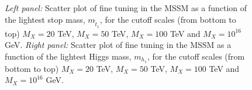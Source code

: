\documentclass[preprint,amsmath,amssymb,aps,superscriptaddress,prd,
showpacs,floatfix,nofootinbib]{revtex4-1}
\begin{document}
\begin{figure}[h]
\begin{center}
\caption{\textit{Left panel:} Scatter plot of fine tuning in the MSSM as a
function of the lightest stop mass, $m_{\tilde{t}_1}$, for the cutoff scales
(from bottom to top) $M_X=20$ TeV, $M_X=50$ TeV, $M_X=100$ TeV and
$M_X=10^{16}$ GeV.  \textit{Right panel:} Scatter plot of fine tuning in the
MSSM as a function of the lightest Higgs mass, $m_{h_1}$, for the cutoff
scales (from bottom to top) $M_X=20$ TeV, $M_X=50$ TeV, $M_X=100$ TeV and
$M_X=10^{16}$ GeV.}
\label{Fig:mssmstoptuning}
\end{center}
\end{figure}
\end{document}
